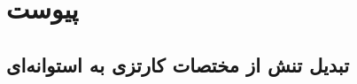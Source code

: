 \documentclass[11pt]{article} %
\begin{document}
\section{پیوست}\subsection{تبدیل تنش از مختصات کارتزی به استوانه‌ای}

%
\end{document}
